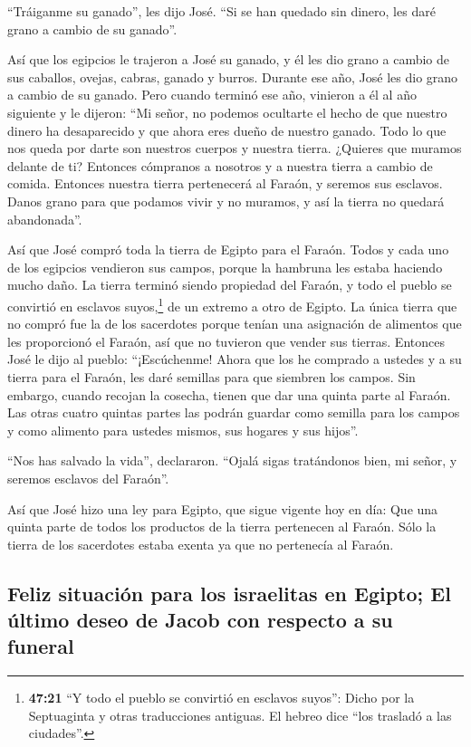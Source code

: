  ``Tráiganme su ganado'', les dijo José. ``Si se han
quedado sin dinero, les daré grano a cambio de su ganado''.

 Así que los egipcios le trajeron a José su ganado, y él
les dio grano a cambio de sus caballos, ovejas, cabras, ganado y burros.
Durante ese año, José les dio grano a cambio de su ganado.
 Pero cuando terminó ese año, vinieron a él al año
siguiente y le dijeron: ``Mi señor, no podemos ocultarte el hecho de que
nuestro dinero ha desaparecido y que ahora eres dueño de nuestro ganado.
Todo lo que nos queda por darte son nuestros cuerpos y nuestra tierra.
 ¿Quieres que muramos delante de ti? Entonces cómpranos a
nosotros y a nuestra tierra a cambio de comida. Entonces nuestra tierra
pertenecerá al Faraón, y seremos sus esclavos. Danos grano para que
podamos vivir y no muramos, y así la tierra no quedará abandonada''.

 Así que José compró toda la tierra de Egipto para el
Faraón. Todos y cada uno de los egipcios vendieron sus campos, porque la
hambruna les estaba haciendo mucho daño. La tierra terminó siendo
propiedad del Faraón,  y todo el pueblo se convirtió en
esclavos suyos,\footnote{\textbf{47:21} ``Y todo el pueblo se convirtió
  en esclavos suyos'': Dicho por la Septuaginta y otras traducciones
  antiguas. El hebreo dice ``los trasladó a las ciudades''.} de un
extremo a otro de Egipto.  La única tierra que no compró
fue la de los sacerdotes porque tenían una asignación de alimentos que
les proporcionó el Faraón, así que no tuvieron que vender sus tierras.
 Entonces José le dijo al pueblo: ``¡Escúchenme! Ahora
que los he comprado a ustedes y a su tierra para el Faraón, les daré
semillas para que siembren los campos.  Sin embargo,
cuando recojan la cosecha, tienen que dar una quinta parte al Faraón.
Las otras cuatro quintas partes las podrán guardar como semilla para los
campos y como alimento para ustedes mismos, sus hogares y sus hijos''.

 ``Nos has salvado la vida'', declararon. ``Ojalá sigas
tratándonos bien, mi señor, y seremos esclavos del Faraón''.

 Así que José hizo una ley para Egipto, que sigue vigente
hoy en día: Que una quinta parte de todos los productos de la tierra
pertenecen al Faraón. Sólo la tierra de los sacerdotes estaba exenta ya
que no pertenecía al Faraón.

\hypertarget{feliz-situaciuxf3n-para-los-israelitas-en-egipto-el-uxfaltimo-deseo-de-jacob-con-respecto-a-su-funeral}{%
\subsection{Feliz situación para los israelitas en Egipto; El último
deseo de Jacob con respecto a su
funeral}\label{feliz-situaciuxf3n-para-los-israelitas-en-egipto-el-uxfaltimo-deseo-de-jacob-con-respecto-a-su-funeral}}

